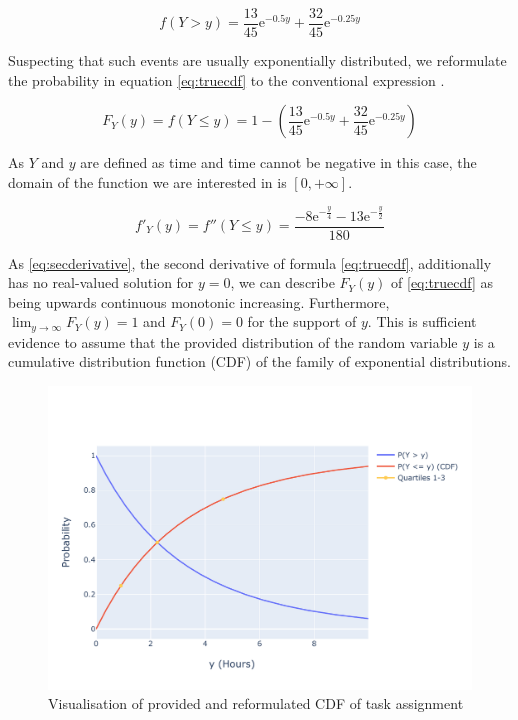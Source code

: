 \begin{equation}  f(Y > y) = \dfrac{13}{45}\mathrm{e}^{-0.5y} + \dfrac{32}{45}\mathrm{e}^{-0.25y}
\label{eq:initcdffractioned}
\end{equation}

Suspecting that such events are usually exponentially distributed, we reformulate the probability in equation \ref{eq:truecdf} to the conventional expression \cite{deisenroth}. 

\begin{equation}  F_Y(y) = f(Y \leq y) =1-\left( \dfrac{13}{45}\mathrm{e}^{-0.5y} + \dfrac{32}{45}\mathrm{e}^{-0.25y} \right)
\label{eq:truecdf}
\end{equation}

As $Y$ and $y$ are defined as time and time cannot be negative in this case, the domain of the function we are interested in is $[0,+\infty]$.

\begin{equation} f'_Y(y) = f''(Y \leq y) = 
\dfrac{-8\mathrm{e}^{-\frac{y}{4}}-13\mathrm{e}^{-\frac{y}{2}}}{180}
\label{eq:secderivative}
\end{equation}

As \ref{eq:secderivative}, the second derivative of formula \ref{eq:truecdf},  additionally has no real-valued solution for $y=0$, we can describe $F_Y(y)$ of \ref{eq:truecdf} as being upwards continuous monotonic increasing. Furthermore, $\lim_{y\to\infty} F_Y(y)= 1$ and $F_Y(0)= 0$ for the support of $y$. This is sufficient evidence to assume that the provided distribution of the random variable $y$ is a cumulative distribution function (CDF) of the family of exponential distributions. 

\begin{figure}[h]
\centering
\includegraphics[width=16cm]{pics/1c1.pdf}
\caption{Visualisation of provided and reformulated CDF of task assignment}
\label{fig:1c1}
\end{figure}
\FloatBarrier


